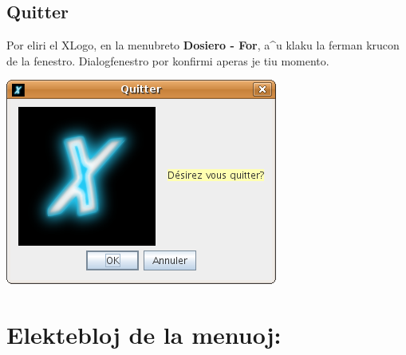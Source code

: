 \section{Quitter}
Por eliri el XLogo, en la menubreto \textbf{Dosiero - For}, a^u klaku
la ferman krucon de la fenestro.  Dialogfenestro por konfirmi aperas
je tiu momento.
\begin{center}
 \includegraphics[scale=0.4]{bildoj/CaptureQuitter.png}
\end{center}
\chapter{Elektebloj de la menuoj:}
